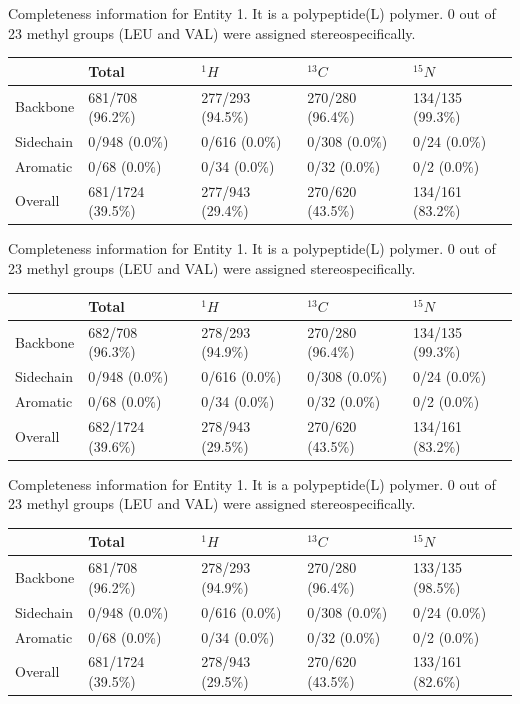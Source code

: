Completeness information for Entity 1. It is a polypeptide(L) polymer. 0 out of 23 methyl groups (LEU and VAL) were assigned stereospecifically.\begin{longtable}{|l|l|l|l|l|}
\hline
  & Total & $^{1}H$ & $^{13}C$ & $^{15}N$\\\hline
Backbone & 681/708 (96.2\%)& 277/293 (94.5\%)& 270/280 (96.4\%)& 134/135 (99.3\%) \\
\hline
Sidechain & 0/948 (0.0\%)& 0/616 (0.0\%)& 0/308 (0.0\%)& 0/24 (0.0\%) \\
\hline
Aromatic & 0/68 (0.0\%)& 0/34 (0.0\%)& 0/32 (0.0\%)& 0/2 (0.0\%) \\
\hline
Overall & 681/1724 (39.5\%)& 277/943 (29.4\%)& 270/620 (43.5\%)& 134/161 (83.2\%) \\
\hline
\end{longtable}
Completeness information for Entity 1. It is a polypeptide(L) polymer. 0 out of 23 methyl groups (LEU and VAL) were assigned stereospecifically.\begin{longtable}{|l|l|l|l|l|}
\hline
  & Total & $^{1}H$ & $^{13}C$ & $^{15}N$\\\hline
Backbone & 682/708 (96.3\%)& 278/293 (94.9\%)& 270/280 (96.4\%)& 134/135 (99.3\%) \\
\hline
Sidechain & 0/948 (0.0\%)& 0/616 (0.0\%)& 0/308 (0.0\%)& 0/24 (0.0\%) \\
\hline
Aromatic & 0/68 (0.0\%)& 0/34 (0.0\%)& 0/32 (0.0\%)& 0/2 (0.0\%) \\
\hline
Overall & 682/1724 (39.6\%)& 278/943 (29.5\%)& 270/620 (43.5\%)& 134/161 (83.2\%) \\
\hline
\end{longtable}
Completeness information for Entity 1. It is a polypeptide(L) polymer. 0 out of 23 methyl groups (LEU and VAL) were assigned stereospecifically.\begin{longtable}{|l|l|l|l|l|}
\hline
  & Total & $^{1}H$ & $^{13}C$ & $^{15}N$\\\hline
Backbone & 681/708 (96.2\%)& 278/293 (94.9\%)& 270/280 (96.4\%)& 133/135 (98.5\%) \\
\hline
Sidechain & 0/948 (0.0\%)& 0/616 (0.0\%)& 0/308 (0.0\%)& 0/24 (0.0\%) \\
\hline
Aromatic & 0/68 (0.0\%)& 0/34 (0.0\%)& 0/32 (0.0\%)& 0/2 (0.0\%) \\
\hline
Overall & 681/1724 (39.5\%)& 278/943 (29.5\%)& 270/620 (43.5\%)& 133/161 (82.6\%) \\
\hline
\end{longtable}
